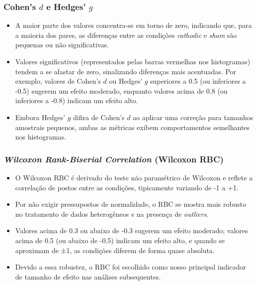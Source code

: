 \subsubsection{Cohen's \(d\) e Hedges' \(g\) }
\begin{itemize}
    \item A maior parte dos valores concentra-se em torno de zero, indicando que, para a maioria dos pares, as diferenças entre as condições \textit{cathodic} e \textit{sham} são pequenas ou não significativas.
    \item Valores significativos (representados pelas barras vermelhas nos histogramas) tendem a se afastar de zero, sinalizando diferenças mais acentuadas. Por exemplo, valores de Cohen's \(d\) ou Hedges' \(g\)  superiores a 0.5 (ou inferiores a -0.5) sugerem um efeito moderado, enquanto valores acima de 0.8 (ou inferiores a -0.8) indicam um efeito alto.
    \item Embora Hedges' \(g\)  difira de Cohen's \(d\) ao aplicar uma correção para tamanhos amostrais pequenos, ambas as métricas exibem comportamentos semelhantes nos histogramas.
\end{itemize}

\subsubsection{\textit{Wilcoxon Rank-Biserial Correlation} (Wilcoxon RBC)}
\begin{itemize}
    \item O Wilcoxon RBC é derivado do teste não paramétrico de Wilcoxon e reflete a correlação de postos entre as condições, tipicamente variando de -1 a +1.
    \item Por não exigir pressupostos de normalidade, o RBC se mostra mais robusto no tratamento de dados heterogêneos e na presença de \textit{outliers}.
    \item Valores acima de 0.3 ou abaixo de -0.3 sugerem um efeito moderado; valores acima de 0.5 (ou abaixo de -0.5) indicam um efeito alto, e quando se aproximam de ±1, as condições diferem de forma quase absoluta.
    \item Devido a essa robustez, o RBC foi escolhido como nosso principal indicador de tamanho de efeito nas análises subsequentes.
\end{itemize}

